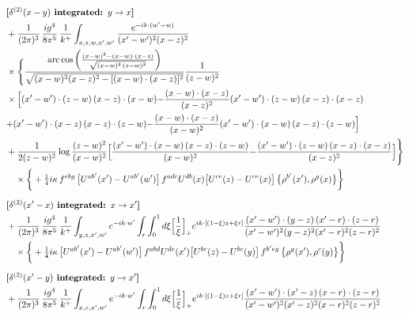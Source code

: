 \documentclass[10pt]{article}
\numberwithin{equation}{section}
\begin{document}
\begin{align}
&\textbf{[$\delta^{(2)}(x-y)$ integrated: $y\to x$]}\notag\\
&+\frac{1}{(2\pi)^{3}}\,\frac{ig^{4}}{8\pi^{5}}\,\frac{1}{k^{+}}\int_{x,z,w,x^{\prime},w^{\prime}}\frac{e^{-ik\cdot(w^{\prime}-w)}}{(x^{\prime}-w^{\prime})^{2}(x-z)^{2}}\notag\\
&\times\Bigg\{\frac{\mathrm{arc\,cos}\left(\frac{(x-w)^{2}-(x-w)\cdot (x-z)}{\sqrt{(x-w)^{2}\,(z-w)^{2}}}\right)}{\sqrt{(x-w)^{2}(x-z)^{2}-[(x-w)\cdot(x-z)]^{2}}}\frac{1}{(z-w)^{2}}\notag\\
&\times\Big[{(x^{\prime}-w^{\prime})\cdot(z-w)\,(x-z)\cdot(x-w)}{-\frac{(x-w)\cdot(x-z)}{(x-z)^{2}}(x^{\prime}-w^{\prime})\cdot(z-w)\,(x-z)\cdot(x-z)}\notag\\
&{+(x^{\prime}-w^{\prime})\cdot(x-z)\,(x-z)\cdot(z-w)}{-\frac{(x-w)\cdot(x-z)}{(x-w)^{2}}(x^{\prime}-w^{\prime})\cdot(x-w)\,(x-z)\cdot(z-w)}\Big]\notag\\
&+\frac{1}{2(z-w)^{2}}\log\frac{(z-w)^{2}}{(x-w)^{2}}\Big[{\frac{(x^{\prime}-w^{\prime})\cdot(x-w)\,(x-z)\cdot(z-w)}{(x-w)^{2}}}{-\frac{(x^{\prime}-w^{\prime})\cdot(z-w)\,(x-z)\cdot(x-z)}{(x-z)^{2}}}\Big]\Bigg\}\notag\\
&\quad\times\bigg\{+\tfrac14 i\kappa\,f^{ebg}\,\big[U^{ab^{\prime}}(x^{\prime})-U^{ab^{\prime}}(w^{\prime})\big]\,f^{adc}U^{db}(x)\big[U^{ce}(z)-U^{ce}(x)\big]\,\big\{\rho^{b^{\prime}}(x^{\prime}),\rho^{g}(x)\big\}\bigg\}\notag\\[6pt]
&\textbf{[$\delta^{(2)}(x^{\prime}-x)$ integrated: $x\to x^{\prime}$]}\notag\\
&+\frac{1}{(2\pi)^{3}}\,\frac{ig^{4}}{8\pi^{5}}\,\frac{1}{k^{+}}\int_{y,z,x^{\prime},w^{\prime}}e^{-ik\cdot w^{\prime}}\int_{r}\int_{0}^{1}d\xi\Big[\frac1\xi\Big]_{+}e^{ik\cdot[(1-\xi)z+\xi r]}\frac{(x^{\prime}-w^{\prime})\cdot(y-z)\,(x^{\prime}-r)\cdot(z-r)}{(x^{\prime}-w^{\prime})^{2}(y-z)^{2}(x^{\prime}-r)^{2}(z-r)^{2}}\notag\\
&\quad\times\bigg\{+\tfrac14 i\kappa\,\big[U^{ab^{\prime}}(x^{\prime})-U^{ab^{\prime}}(w^{\prime})\big]\,f^{abd}U^{de}(x^{\prime})\big[U^{bc}(z)-U^{bc}(y)\big]\,f^{b^{\prime}eg}\,\big\{\rho^{g}(x^{\prime}),\rho^{c}(y)\big\}\bigg\}\notag\\[6pt]
&\textbf{[$\delta^{(2)}(x^{\prime}-y)$ integrated: $y\to x^{\prime}$]}\notag\\
&+\frac{1}{(2\pi)^{3}}\,\frac{ig^{4}}{8\pi^{5}}\,\frac{1}{k^{+}}\int_{x,z,x^{\prime},w^{\prime}}e^{-ik\cdot w^{\prime}}\int_{r}\int_{0}^{1}d\xi\Big[\frac1\xi\Big]_{+}e^{ik\cdot[(1-\xi)z+\xi r]}\frac{(x^{\prime}-w^{\prime})\cdot(x^{\prime}-z)\,(x-r)\cdot(z-r)}{(x^{\prime}-w^{\prime})^{2}(x^{\prime}-z)^{2}(x-r)^{2}(z-r)^{2}}\notag\\

\end{align}
\end{document}

